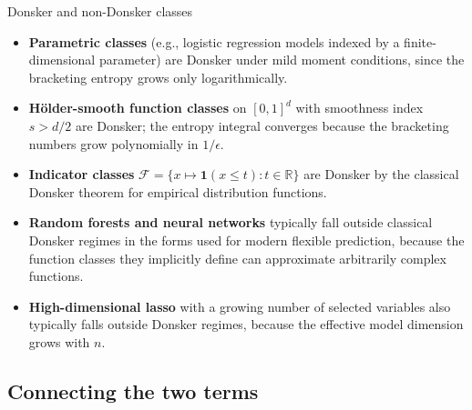 \documentclass[master.tex]{subfiles}
\begin{document}
\begin{example}{Donsker and non-Donsker classes}
\label{w11:ex:donsker}
\leavevmode
\begin{itemize}
  \item \textbf{Parametric classes} (e.g., logistic regression
    models indexed by a finite-dimensional parameter) are Donsker
    under mild moment conditions, since the bracketing entropy
    grows only logarithmically.
  \item \textbf{Hölder-smooth function classes} on $[0,1]^d$
    with smoothness index $s > d/2$ are Donsker; the entropy
    integral converges because the bracketing numbers grow
    polynomially in $1/\epsilon$.
  \item \textbf{Indicator classes} $\mathcal{F} = \{x \mapsto
    \mathbf{1}(x \leq t) : t \in \mathbb{R}\}$ are Donsker
    by the classical Donsker theorem for empirical distribution
    functions.
  \item \textbf{Random forests and neural networks} typically fall
    outside classical Donsker regimes in the forms used for modern
    flexible prediction, because the function classes they implicitly
    define can approximate arbitrarily complex functions.
  \item \textbf{High-dimensional lasso} with a growing number of
    selected variables also typically falls outside Donsker regimes,
    because the effective model dimension grows with $n$.
\end{itemize}
\end{example}

\subsection{Connecting the two terms}
\label{w11:subsec:donsker-role}
\end{document}
